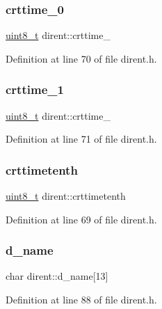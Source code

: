 \subsubsection{\texorpdfstring{crttime\_0}{crttime\_0}}
{\footnotesize\ttfamily \mbox{\hyperlink{stdint_8h_aba7bc1797add20fe3efdf37ced1182c5}{uint8\+\_\+t}} dirent\+::crttime\+\_}



Definition at line 70 of file dirent.\+h.

\mbox{\label{structdirent_aa596c172166b19094754f29f178296e4}} 
\subsubsection{\texorpdfstring{crttime\_1}{crttime\_1}}
{\footnotesize\ttfamily \mbox{\hyperlink{stdint_8h_aba7bc1797add20fe3efdf37ced1182c5}{uint8\+\_\+t}} dirent\+::crttime\+\_}



Definition at line 71 of file dirent.\+h.

\mbox{\label{structdirent_a66fbef238aa58e10823a0ff52427bdaf}} 
\subsubsection{\texorpdfstring{crttimetenth}{crttimetenth}}
{\footnotesize\ttfamily \mbox{\hyperlink{stdint_8h_aba7bc1797add20fe3efdf37ced1182c5}{uint8\+\_\+t}} dirent\+::crttimetenth}



Definition at line 69 of file dirent.\+h.

\mbox{\label{structdirent_afa57a259a03b5f621707f110350980c7}} 
\subsubsection{\texorpdfstring{d\_name}{d\_name}}
{\footnotesize\ttfamily char dirent\+::d\+\_\+name\mbox{[}13\mbox{]}}



Definition at line 88 of file dirent.\+h.

